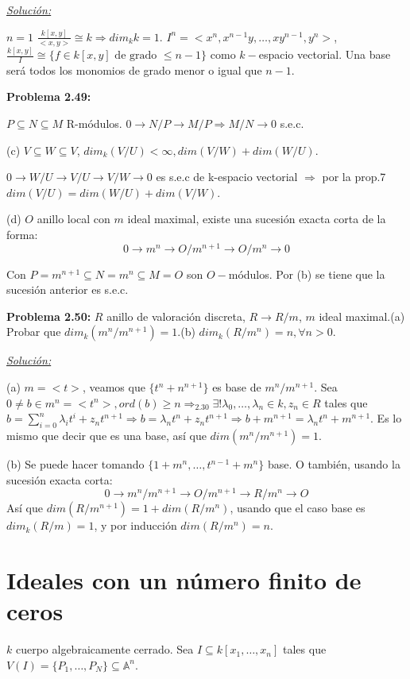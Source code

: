 \underline{\textit{Solución: }}

$n=1$ $\frac{k[x,y]}{<x,y>}\cong k \Rightarrow dim_k k = 1$. 
$I^n=<x^n,x^{n-1}y, \dots, xy^{n-1},y^n>$, $\frac{k[x,y]}{I}\cong \{f\in k[x,y] \text{ de grado } \le n-1\}$ como $k-$espacio vectorial. Una base será todos los monomios de grado menor o igual que $n-1$. 

\textbf{Problema 2.49:  }

$P\subseteq N \subseteq M$ R-módulos.
$0 \rightarrow N/P \rightarrow M/P \Rightarrow M/N \rightarrow 0$ s.e.c.

(c) $V\subseteq W \subseteq V$, $dim_k(V/U)<\infty, dim(V/W)+dim(W/U)$.

$0\rightarrow W/U \rightarrow V/U \rightarrow V/W \rightarrow 0$ es s.e.c de k-espacio vectorial $\Rightarrow$ por la prop.7 $dim(V/U)=dim(W/U)+dim(V/W)$.

(d) $O$ anillo local con $m$ ideal maximal, existe una sucesión exacta corta de la forma:
$$0 \rightarrow m^n \rightarrow O/m^{n+1} \rightarrow O/m^n \rightarrow 0 $$

Con $P=m^{n+1}\subseteq N=m^n\subseteq M=O$  son $O-$módulos. Por (b) se tiene que la sucesión anterior es s.e.c.


\textbf{Problema 2.50: } $R$ anillo de valoración discreta, $R\rightarrow R/m$, $m$ ideal maximal.(a) Probar que $dim_k(m^n/m^{n+1})=1$.(b) $dim_k(R/m^n)=n,\forall n>0$. 

\underline{\textit{Solución: }}

(a) $m=<t>$, veamos que $\{t^n+n^{n+1}\}$ es base de $m^n/m^{n+1}$.
Sea $0\neq b\in m^n = <t^n>, ord(b)\ge n \Rightarrow_{2.30} \exists ! \lambda_0,\dots,\lambda_n  \in k, z_n \in R$ tales que $b= \sum_{i=0}^n \lambda_it^i + z_nt^{n+1} \Rightarrow b=\lambda_nt^n+z_nt^{n+1} \Rightarrow b+m^{n+1}=\lambda_nt^n+m^{n+1}$. Es lo mismo que decir que es una base, así que $dim(m^n/m^{n+1})=1$. 

(b) Se puede hacer tomando $\{1+m^n,\dots, t^{n-1}+m^n\} $ base. O también, usando la sucesión exacta corta:
$$0\rightarrow m^n/m^{n+1} \rightarrow O/m^{n+1}\rightarrow R/m^n \rightarrow O$$
Así que $dim(R/m^{n+1})=1+dim(R/m^n)$, usando que el caso base es $dim_k(R/m)=1$, y por inducción $dim(R/m^n)=n$. 

\section{Ideales con un número finito de ceros}

$k$ cuerpo algebraicamente cerrado. Sea $I\subseteq k[x_1,\dots,x_n]$ tales que $V(I)=\{P_1,\dots,P_N\}\subseteq \mathbb{A}^n$. 


